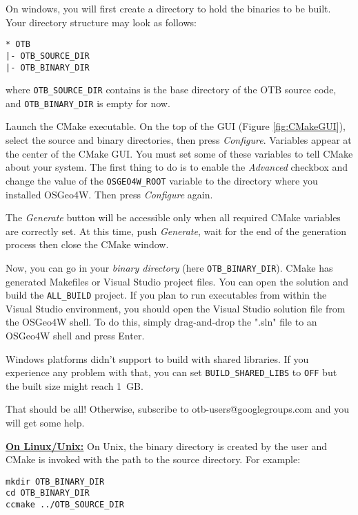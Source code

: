 On windows, you will first create a directory to hold the binaries to be built.
Your directory structure may look as follows:
\begin{verbatim}
* OTB
|- OTB_SOURCE_DIR
|- OTB_BINARY_DIR
\end{verbatim}
where \texttt{OTB\_SOURCE\_DIR} contains is the base directory of the OTB source code, and
\texttt{OTB\_BINARY\_DIR} is empty for now.

Launch the CMake executable. On the top of the GUI (Figure \ref{fig:CMakeGUI}), select the source and binary directories, then press \emph{Configure}.
Variables appear at the center of the CMake GUI. You must set some of these variables to tell CMake about your system. The first thing to do is to enable the \emph{Advanced} checkbox and change the value of the \texttt{OSGEO4W\_ROOT} variable to the directory where you installed OSGeo4W. Then press \emph{Configure} again.

The \emph{Generate} button will be accessible only when all required CMake variables are correctly set. At this time, push \emph{Generate}, wait for the end of the generation process then close the CMake window.

Now, you can go in your \emph{binary directory} (here \texttt{OTB\_BINARY\_DIR}). CMake has generated Makefiles or
Visual Studio project files. You can open the solution and build the \texttt{ALL\_BUILD} project.
If you plan to run executables from within the Visual Studio environment, you should open the Visual Studio
solution file from the OSGeo4W shell. To do this, simply drag-and-drop the ".sln" file to an OSGeo4W shell
and press Enter.

Windows platforms didn't support to build with shared libraries. If you experience any problem
with that, you can set \texttt{BUILD\_SHARED\_LIBS} to \texttt{OFF} but the
built size might reach 1~GB.

That should be all! Otherwise, subscribe to
otb-users@googlegroups.com and you will get some help.

\textbf{\underline{On Linux/Unix:}}
On Unix, the binary directory is created by the user and CMake is invoked with the
path to the source directory. For example:
\small
\begin{verbatim}
mkdir OTB_BINARY_DIR
cd OTB_BINARY_DIR
ccmake ../OTB_SOURCE_DIR
\end{verbatim}
\normalsize

